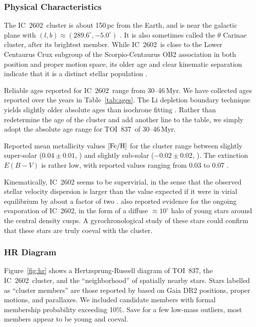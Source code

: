 \documentclass[12pt,twocolumn,tighten]{aastex63}
\newcommand{\tn}{TOI~837} %
\newcommand{\cn}{IC~2602} %
\begin{document}


\subsubsection{Physical Characteristics}
\label{subsec:clusterchar}

The \cn\ cluster is about 150$\,$pc from the Earth, and is near the
galactic plane with $(l,b)\approx(289.6^\circ, -5.0^\circ)$
\citep{cantatgaudin_gaia_2018}.  It is also sometimes called the
$\theta$ Carinae cluster, after its brightest member.  While \cn\ is
close to the Lower Centaurus Crux subgroup of the Scorpio-Centaurus
OB2 association in both position and proper motion space, its older
age and clear kinematic separation indicate that it is a distinct
stellar population
\citep{de_zeeuw_hipparcos_1999,damiani_stellar_2019}.

Reliable ages reported for \cn\ range from 30--46$\,$Myr.  We have
collected ages reported over the years in Table~\ref{tab:ages}.  The
Li depletion boundary technique yields slightly older absolute ages
than isochrone fitting \citep{dobbie_ic_2010,randich_gaiaeso_2018}.
Rather than redetermine the age of the cluster and add another line to
the table, we simply adopt the absolute age range for \tn\ of
30--46$\,$Myr.

Reported mean metallicity values ${\rm [Fe/H]}$ for the cluster range
between slightly super-solar ($0.04\pm0.01$,
\citealt{baratella_gaia-eso_2020}) and slightly sub-solar ($-0.02 \pm
0.02$, \citealt{netopil_metallicity_2016}).  The extinction $E(B-V)$
is rather low, with reported values ranging from 0.03 to 0.07
\citep[{\it e.g.},][]{randich_gaiaeso_2018}.

Kinematically, IC~2602 seems to be supervirial, in the sense that the
observed stellar velocity dispersion is larger than the value expected
if it were in virial equilibrium by about a factor of two
\citep{bravi_gaia-eso_2018}.  \citet{damiani_stellar_2019} also
reported evidence for the ongoing evaporation of \cn, in the form of a
diffuse $\approx10^\circ$ halo of young stars around the central
density cusps.  A gyrochronological study of these stars could confirm
that these stars are truly coeval with the cluster.

\subsubsection{HR Diagram}

Figure~\ref{fig:hr} shows a Hertzsprung-Russell diagram of \tn, the
\cn\ cluster, and the ``neighborhood'' of spatially nearby stars.
Stars labelled as ``cluster members'' are those reported by
\citet{cantatgaudin_gaia_2018} based on Gaia DR2 positions, proper
motions, and parallaxes.  We included candidate members with formal
membership probability exceeding 10\%.  Save for a few low-mass
outliers, most members appear to be young and coeval.
\end{document}
